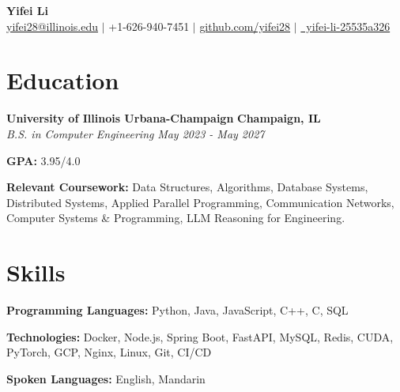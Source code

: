 \documentclass[10pt, a4paper]{article}
\newcommand{\resumeSubheading}[4]{
  \textbf{#1} \hfill \small{\textbf{#2}} \\
  \textit{\small#3} \hfill \small{\textit{#4}}
}
\begin{document}
\fontsize{9.5pt}{11.5pt}\selectfont

\begin{center}
  {\Large \textbf{Yifei Li}} \\ \vspace{2pt}
  \small \href{mailto:yifei28@illinois.edu}{yifei28@illinois.edu} $|$ +1-626-940-7451 $|$ \href{https://github.com/yifei28}{github.com/yifei28} $|$ \href{https://www.linkedin.com/in/yifei-li-25535a326/}{\faLinkedinSquare\ yifei-li-25535a326}
\end{center}

\section{Education}
\vspace{-7pt}
\begin{resumeItemList}
  \item \resumeSubheading
  {University of Illinois Urbana-Champaign}{Champaign, IL}
  {B.S. in Computer Engineering}{May 2023 - May 2027}
  \vspace{1pt}
  \item \small{\textbf{GPA:} 3.95/4.0}
  \item \small{\textbf{Relevant Coursework:} Data Structures, Algorithms, Database Systems, Distributed Systems, Applied Parallel Programming, Communication Networks, Computer Systems \& Programming, LLM Reasoning for Engineering.}
\end{resumeItemList}

\section{Skills}
\vspace{-7pt}
\begin{resumeItemList}
  \item \small{\textbf{Programming Languages:} Python, Java, JavaScript, C++, C, SQL}
  \item \small{\textbf{Technologies:} Docker, Node.js, Spring Boot, FastAPI, MySQL, Redis, CUDA, PyTorch, GCP, Nginx, Linux, Git, CI/CD}
  \item \small{\textbf{Spoken Languages:} English, Mandarin}
\end{resumeItemList}

\end{document}
